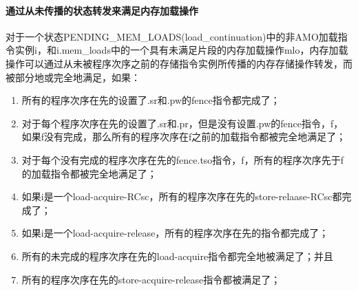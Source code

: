 \paragraph{通过从未传播的状态转发来满足内存加载操作}\label{omm:sat_by_forwarding}
对于一个状态PENDING_MEM_LOADS(load_continuation)中的非AMO加载指令实例i，和i.mem_loads中的一个具有未满足片段的内存加载操作mlo，内存加载操作可以通过从未被程序次序之前的存储指令实例所传播的内存存储操作转发，而被部分地或完全地满足，如果：
\begin{enumerate}
\item 所有的程序次序在先的设置了.sr和.pw的fence指令都完成了；  %
\item 对于每个程序次序在先的设置了.sr和.pr，但是没有设置.pw的fence指令，f，如果f没有完成，那么所有的程序次序在f之前的加载指令都被完全地满足了；  %
\item 对于每个没有完成的程序次序在先的fence.tso指令，f，所有的程序次序先于f的加载指令都被完全地满足了；  %
\item 如果i是一个load-acquire-RCsc，所有的程序次序在先的store-relaase-RCsc都完成了；  %
\item 如果i是一个load-acquire-release，所有的程序次序在先的指令都完成了；  %
\item 所有的未完成的程序次序在先的load-acquire指令都完全地被满足了；并且  %
\item 所有的程序次序在先的store-acquire-release指令都被满足了；  %
\end{enumerate}

